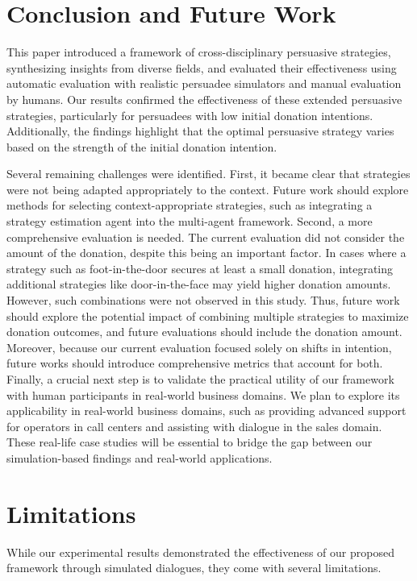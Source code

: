 \documentclass[11pt]{article}
\begin{document}
\section{Conclusion and Future Work}
\label{sec:conclusion_and_future_work}
This paper introduced a framework of cross-disciplinary persuasive strategies, synthesizing insights from diverse fields, and evaluated their effectiveness using automatic evaluation with realistic persuadee simulators and manual evaluation by humans.
Our results confirmed the effectiveness of these extended persuasive strategies, particularly for persuadees with low initial donation intentions.
Additionally, the findings highlight that the optimal persuasive strategy varies based on the strength of the initial donation intention. 

Several remaining challenges were identified. 
First, it became clear that strategies were not being adapted appropriately to the context.
Future work should explore methods for selecting context-appropriate strategies, such as integrating a strategy estimation agent into the multi-agent framework.
Second, a more comprehensive evaluation is needed. 
The current evaluation did not consider the amount of the donation, despite this being an important factor. 
In cases where a strategy such as foot-in-the-door secures at least a small donation, integrating additional strategies like door-in-the-face may yield higher donation amounts. However, such combinations were not observed in this study. Thus, future work should explore the potential impact of combining multiple strategies to maximize donation outcomes, and future evaluations should include the donation amount. Moreover, because our current evaluation focused solely on shifts in intention, future works should introduce comprehensive metrics that account for both. 
Finally, a crucial next step is to validate the practical utility of our framework with human participants in real-world business domains. 
We plan to explore its applicability in real-world business domains, such as providing advanced support for operators in call centers and assisting with dialogue in the sales domain. 
These real-life case studies will be essential to bridge the gap between our simulation-based findings and real-world applications.


\section*{Limitations}
While our experimental results demonstrated the effectiveness of our proposed framework through simulated dialogues, they come with several limitations.
\end{document}
